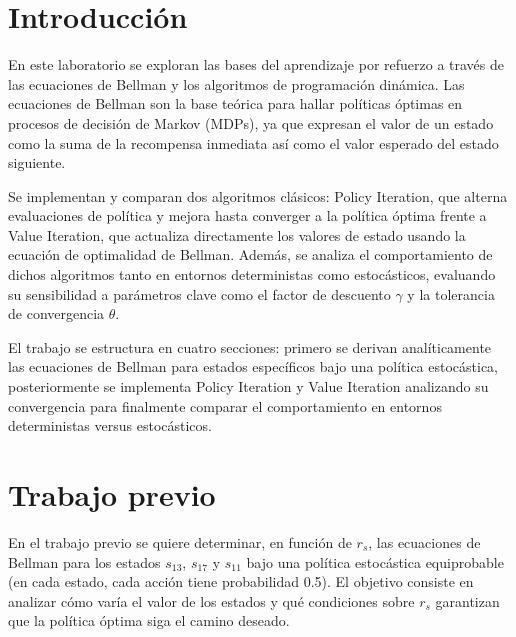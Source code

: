 \documentclass[a4paper,12pt]{article}
\newcommand{\vacio}{\textcolor{white}{ .}}
\begin{document}
\renewcommand{\footrulewidth}{0.5pt}
\fancyfoot[C]{\vacio}


\renewcommand{\contentsname}{Índice}
\tableofcontents
{}

\newpage


\section{Introducción}

En este laboratorio se exploran las bases del aprendizaje por refuerzo a través de las ecuaciones de Bellman y los algoritmos de programación dinámica. 
Las ecuaciones de Bellman son la base teórica para hallar políticas óptimas en procesos de decisión de Markov (MDPs), ya que expresan el valor de un estado 
como la suma de la recompensa inmediata así como el valor esperado del estado siguiente.

Se implementan y comparan dos algoritmos clásicos: Policy Iteration, que alterna evaluaciones de política y mejora hasta converger a la política óptima frente a
Value Iteration, que actualiza directamente los valores de estado usando la ecuación de optimalidad de Bellman. Además, se analiza el comportamiento de dichos 
algoritmos tanto en entornos deterministas como estocásticos, evaluando su sensibilidad a parámetros clave como el factor de descuento $\gamma$ y la 
tolerancia de convergencia $\theta$.

El trabajo se estructura en cuatro secciones: primero se derivan analíticamente las ecuaciones de Bellman para estados específicos bajo una política estocástica, 
posteriormente se implementa Policy Iteration y Value Iteration analizando su convergencia para finalmente comparar el comportamiento en entornos deterministas 
versus estocásticos.

\section{Trabajo previo}

En el trabajo previo se quiere determinar, en función de $r_s$, las ecuaciones de Bellman 
para los estados $s_{13}$, $s_{17}$ y $s_{11}$ bajo una política estocástica equiprobable 
(en cada estado, cada acción tiene probabilidad 0.5). 
El objetivo consiste en analizar cómo varía el valor de los estados y qué condiciones sobre $r_s$ 
garantizan que la política óptima siga el camino deseado.
\end{document}
